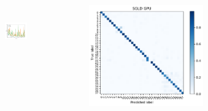 \documentclass[10pt,a4paper]{beamer}
\begin{document}
\begin{frame}
\begin{columns}[T]
\begin{figure}
		\label{fig:sgd_gpu_performance}
	\end{figure}
\end{columns}
	\begin{columns}[T]
	\begin{figure}
		\includegraphics[width=\textwidth,height=3cm]{results/sgld_losloss}
	\end{figure}
	\begin{figure}
		\includegraphics[width=\textwidth]{results/plants_confusion_matrix_sgld_gpu}
		\label{fig:sgld_cpu_performance}
	\end{figure}
	\begin{figure}

\end{figure}
\end{columns}
\end{frame}
\end{document}
